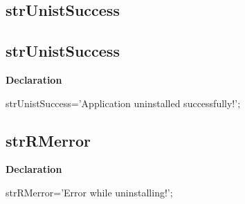 \documentclass{report}
\newif\ifpdf
\begin{document}
\subsection*{\large{\textbf{strUnistSuccess}}\normalsize\hspace{1ex}\hrulefill}
\else
\subsection*{strUnistSuccess}
\fi
\label{trstrings-strUnistSuccess}
\begin{list}{}{
\setlength{\itemindent}{0cm}
\setlength{\listparindent}{0cm}
\setlength{\leftmargin}{\evensidemargin}
\addtolength{\leftmargin}{\tmplength}
\settowidth{\labelsep}{X}
\addtolength{\leftmargin}{\labelsep}
\setlength{\labelwidth}{\tmplength}
}
\item[\textbf{Declaration}\hfill]
\ifpdf
\begin{flushleft}
\fi
\begin{ttfamily}
strUnistSuccess='Application uninstalled successfully!';\end{ttfamily}

\ifpdf
\end{flushleft}
\fi

\end{list}
\ifpdf
\subsection*{\large{\textbf{strRMerror}}\normalsize\hspace{1ex}\hrulefill}
\else
\subsection*{strRMerror}
\fi
\label{trstrings-strRMerror}
\begin{list}{}{
\setlength{\itemindent}{0cm}
\setlength{\listparindent}{0cm}
\setlength{\leftmargin}{\evensidemargin}
\addtolength{\leftmargin}{\tmplength}
\settowidth{\labelsep}{X}
\addtolength{\leftmargin}{\labelsep}
\setlength{\labelwidth}{\tmplength}
}
\item[\textbf{Declaration}\hfill]
\ifpdf
\begin{flushleft}
\fi
\begin{ttfamily}
strRMerror='Error while uninstalling!';\end{ttfamily}

\ifpdf
\end{flushleft}
\fi

\end{list}
\ifpdf
\end{document}
